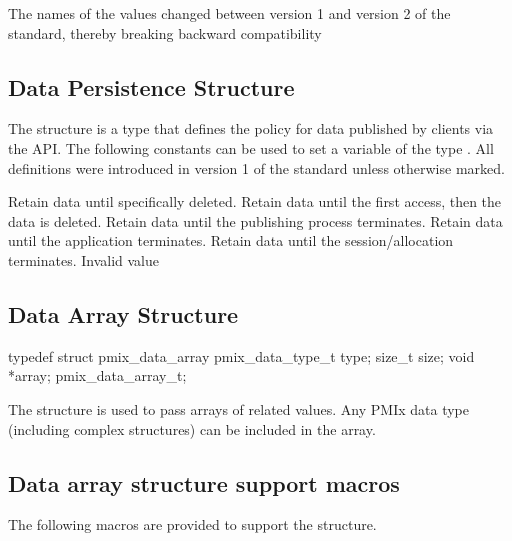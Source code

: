 \adviceuserstart
The names of the  values changed between version 1 and version 2 of the standard, thereby breaking backward compatibility
\adviceuserend

\subsection{Data Persistence Structure}

The  structure is a  type that defines the policy for data published by clients via the  \ac{API}.
The following constants can be used to set a variable of the type . All definitions were introduced in version 1 of the standard unless otherwise marked.

\begin{constantdesc}
%
Retain data until specifically deleted.
%
Retain data until the first access, then the data is deleted.
%
Retain data until the publishing process terminates.
%
Retain data until the application terminates.
%
Retain data until the session/allocation terminates.
%
Invalid value
%
\end{constantdesc}

\subsection{Data Array Structure}

\cspecificstart
\begin{codepar}
typedef struct pmix_data_array {
    pmix_data_type_t type;
    size_t size;
    void *array;
} pmix_data_array_t;
\end{codepar}
\cspecificend

The  structure is used to pass arrays of related values. Any \ac{PMIx} data type (including complex structures) can be included in the array.

\subsection{Data array structure support macros}
The following macros are provided to support the  structure.

